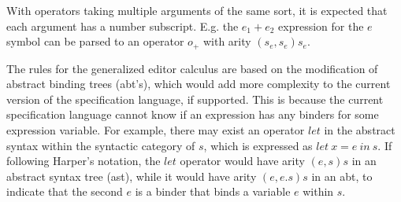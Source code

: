 \documentclass{article}
\begin{document}
With operators taking multiple arguments of the same sort, it is expected that each argument has a number subscript. E.g. the $e_1 + e_2$ expression for the $e$ symbol can be parsed to an operator $o_+$ with arity $(s_e, s_e)s_e$.

The rules for the generalized editor calculus\cite{aalborg} are based on the modification of abstract binding trees (abt's), which would add more complexity to the current version of the specification language, if supported. This is because the current specification language cannot know if an expression has any binders for some expression variable. For example, there may exist an operator $let$ in the abstract syntax within the syntactic category of $s$, which is expressed as $let \  x = e \ in \ s$.
If following Harper's notation\cite{practical-foundations-for-prog-lang}, the $let$ operator would have arity $(e,s)s$ in an abstract syntax tree (ast), while it would have arity $(e,e.s)s$ in an abt, to indicate that the second $e$ is a binder that binds a variable $e$ within $s$.


\printbibliography
\end{document}

